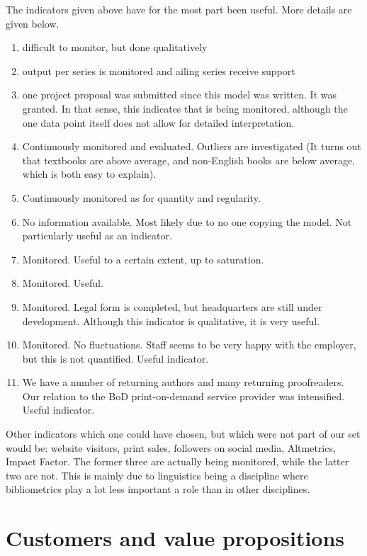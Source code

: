 \documentclass[output=guidelines,nonflat,smallfont,
draftmode
]{langsci/langscibook}
\newcommand{\evaluation}[1]{
  \renewcommand{\tblslinecolour}{lsLightOrange}
  \tblssy{receipt}{Evaluation}{\vspace*{-5mm}#1}
}
\newcommand{\othersolutions}[1]{
  \renewcommand{\tblslinecolour}{lsDarkGreenOne}
  \tblssy{more}{Other solutions}{\vspace*{-5mm}#1}
}
\renewcommand{\tblssy}[4][black!12]{%
  \renewcommand{\langscisymbol}{#2}\renewcommand{\tblsboxcolor}{#1}
  \begin{mdframed}[style=yellowexercise,frametitle={#3}]
    #4
  \end{mdframed}
}
\begin{document}
\evaluation{
The indicators given above have for the most part been useful. More details are given below.
\begin{enumerate}
\item difficult to monitor, but done qualitatively
\item output per series is monitored and ailing series receive support
\item one project proposal was submitted since this model was written. It was granted. In that sense, this indicates that is being monitored, although the one data point itself does not allow for detailed interpretation. 
\item Continuously monitored and evaluated. Outliers are investigated (It turns out that textbooks are above average, and non-English books are below average, which is both easy to explain). 
\item Continuously monitored as for quantity and regularity. 
\item No information available. Most likely due to no one copying the model. Not particularly useful as an indicator.
\item Monitored. Useful to a certain extent, up to saturation. 
\item Monitored. Useful. 
\item Monitored. Legal form is completed, but headquarters are still under development. Although this indicator is qualitative, it is very useful. 
\item Monitored. No fluctuations. Staff seems to be very happy with the employer, but this is not quantified. Useful indicator. 
\item We have a number of returning authors and many returning proofreaders. Our relation to the BoD print-on-demand service provider was intensified. Useful indicator.
\end{enumerate}
}
\othersolutions{ 
Other indicators which one could have chosen, but which were not part of our set would be:
website visitors, print sales, followers on social media, Altmetrics, Impact Factor. The former three are actually being monitored, while the latter two are not. This is mainly due to linguistics being a discipline where bibliometrics play a lot less important a role than in other disciplines.
}

 
\clearpage
\section{Customers and value propositions}
\end{document}

